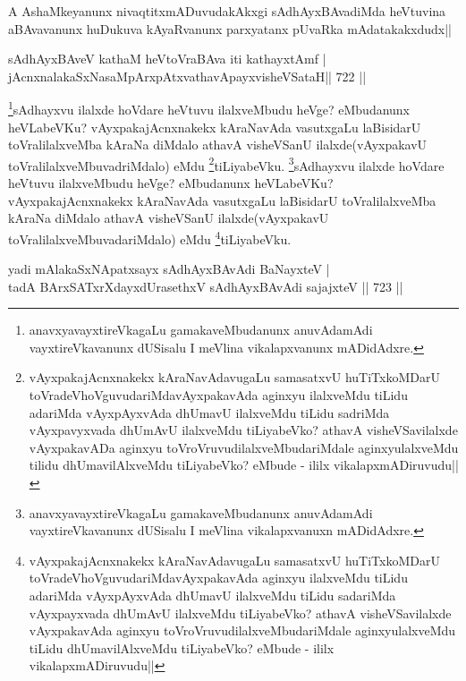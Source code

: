 \begin{artha}
A AshaMkeyanunx nivaqtitxmADuvudakAkxgi sAdhAyxBAvadiMda heVtuvina aBAvavanunx huDukuva kAyaRvanunx parxyatanx pUvaRka mAdatakakxdudx||
\end{artha}

\begin{shl}
sAdhAyxBAveV kathaM heVtoVraBAva iti kathayxtAmf | \\
jAcnxnalakaSxNasaMpArxpAtxvathavA\s payxvisheVSataH\hfill||  722 || 
\end{shl}

\begin{artha}
\footnote{anavxyavayxtireVkagaLu gamakaveMbudanunx anuvAdamAdi vayxtireVkavanunx dUSisalu I meVlina vikalapxvanunx mADidAdxre.}sAdhayxvu ilalxde hoVdare heVtuvu ilalxveMbudu heVge? eMbudanunx heVLabeVKu? vAyxpakajAcnxnakekx kAraNavAda vasutxgaLu laBisidarU toVralilalxveMba kAraNa diMdalo athavA visheVSanU ilalxde(vAyxpakavU toVralilalxveMbuvadriMdalo) eMdu \footnote{vAyxpakajAcnxnakekx kAraNavAdavugaLu  samasatxvU huTiTxkoMDarU toVradeVhoVguvudariMdavAyxpakavAda aginxyu ilalxveMdu tiLidu adariMda vAyxpAyxvAda dhUmavU ilalxveMdu tiLidu sadriMda vAyxpavyxvada dhUmAvU ilalxveMdu tiLiyabeVko? athavA visheVSavilalxde vAyxpakavADa aginxyu toVroVruvudilalxveMbudariMdale aginxyulalxveMdu tilidu dhUmavilAlxveMdu tiLiyabeVko? eMbude - ililx vikalapxmADiruvudu||}tiLiyabeVku.
\footnote{anavxyavayxtireVkagaLu gamakaveMbudanunx anuvAdamAdi vayxtireVkavanunx dUSisalu I meVlina vikalapxvanuxn mADidAdxre.}sAdhayxvu ilalxde hoVdare heVtuvu ilalxveMbudu heVge? eMbudanunx heVLabeVKu? vAyxpakajAcnxnakekx kAraNavAda vasutxgaLu laBisidarU toVralilalxveMba kAraNa diMdalo athavA visheVSanU ilalxde(vAyxpakavU toVralilalxveMbuvadariMdalo) eMdu \footnote{vAyxpakajAcnxnakekx kAraNavAdavugaLu  samasatxvU huTiTxkoMDarU toVradeVhoVguvudariMdavAyxpakavAda aginxyu ilalxveMdu tiLidu adariMda vAyxpAyxvAda dhUmavU ilalxveMdu tiLidu sadariMda vAyxpayxvada dhUmAvU ilalxveMdu tiLiyabeVko? athavA visheVSavilalxde vAyxpakavAda aginxyu toVroVruvudilalxveMbudariMdale aginxyulalxveMdu tiLidu dhUmavilAlxveMdu tiLiyabeVko? eMbude - ililx vikalapxmADiruvudu||}tiLiyabeVku.
\end{artha}


\begin{shl}
yadi mAlakaSxNApatxsayx sAdhAyxBAvAdi BaNayxteV | \\
tadA BArxSATxrXdayxdUrasethxV sAdhAyxBAvAdi sajajxteV \hfill||  723 ||  
\end{shl}

